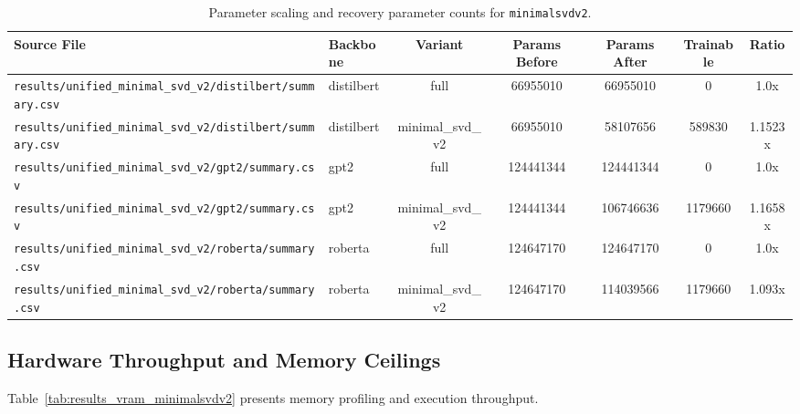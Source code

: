 \begin{table}[t]
\centering
\small
\begin{tabular}{llccccc}
\toprule
\textbf{Source File} & \textbf{Backbone} & \textbf{Variant} & \textbf{Params Before} & \textbf{Params After} & \textbf{Trainable} & \textbf{Ratio} \\
\midrule
\texttt{results/unified\_minimal\_svd\_v2/distilbert/summary.csv} & distilbert & full & 66955010 & 66955010 & 0 & 1.0x \\
\texttt{results/unified\_minimal\_svd\_v2/distilbert/summary.csv} & distilbert & minimal\_svd\_v2 & 66955010 & 58107656 & 589830 & 1.1523x \\
\texttt{results/unified\_minimal\_svd\_v2/gpt2/summary.csv} & gpt2 & full & 124441344 & 124441344 & 0 & 1.0x \\
\texttt{results/unified\_minimal\_svd\_v2/gpt2/summary.csv} & gpt2 & minimal\_svd\_v2 & 124441344 & 106746636 & 1179660 & 1.1658x \\
\texttt{results/unified\_minimal\_svd\_v2/roberta/summary.csv} & roberta & full & 124647170 & 124647170 & 0 & 1.0x \\
\texttt{results/unified\_minimal\_svd\_v2/roberta/summary.csv} & roberta & minimal\_svd\_v2 & 124647170 & 114039566 & 1179660 & 1.093x \\
\bottomrule
\end{tabular}
\caption{Parameter scaling and recovery parameter counts for \texttt{minimalsvdv2}.}
\label{tab:results_params_minimalsvdv2}
\end{table}

\subsection{Hardware Throughput and Memory Ceilings}
Table~\ref{tab:results_vram_minimalsvdv2} presents memory profiling and execution throughput.

